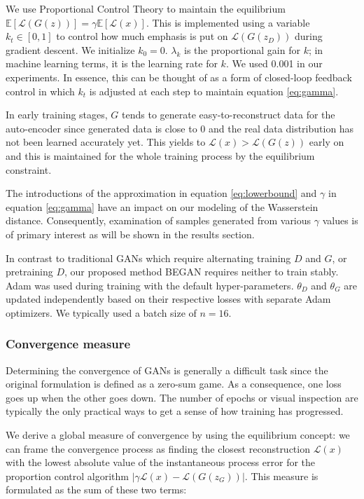 \documentclass[english]{article}
\begin{document}
We use Proportional Control Theory to maintain the equilibrium $\mathbb{E}\left[\mathcal{L}(G(z))\right]=\gamma\mathbb{E}\left[\mathcal{L}(x)\right]$.
This is implemented using a variable $k_{t}\in\left[0,1\right]$ to
control how much emphasis is put on $\mathcal{L}(G(z_{D}))$ during
gradient descent. We initialize $k_{0}=0$. $\lambda_{k}$ is the
proportional gain for $k$; in machine learning terms, it is the learning
rate for $k$. We used 0.001 in our experiments. In essence, this
can be thought of as a form of closed-loop feedback control in which
$k_{t}$ is adjusted at each step to maintain equation \ref{eq:gamma}.

In early training stages, $G$ tends to generate easy-to-reconstruct
data for the auto-encoder since generated data is close to 0 and the
real data distribution has not been learned accurately yet. This yields
to $\mathcal{L}(x)>\mathcal{L}(G(z))$ early on and this is maintained
for the whole training process by the equilibrium constraint. 

The introductions of the approximation in equation \ref{eq:lowerbound}
and $\gamma$ in equation \ref{eq:gamma} have an impact on our modeling
of the Wasserstein distance. Consequently, examination of samples
generated from various $\gamma$ values is of primary interest as
will be shown in the results section. 

In contrast to traditional GANs which require alternating training
$D$ and $G$, or pretraining $D$, our proposed method BEGAN requires
neither to train stably. Adam \cite{kingma2014adam} was used during
training with the default hyper-parameters. $\theta_{D}$ and $\theta_{G}$
are updated independently based on their respective losses with separate
Adam optimizers. We typically used a batch size of $n=16$. 


\subsubsection{Convergence measure}

Determining the convergence of GANs is generally a difficult task
since the original formulation is defined as a zero-sum game. As a
consequence, one loss goes up when the other goes down. The number
of epochs or visual inspection are typically the only practical ways
to get a sense of how training has progressed.

We derive a global measure of convergence by using the equilibrium
concept: we can frame the convergence process as finding the closest
reconstruction $\mathcal{L}(x)$ with the lowest absolute value of
the instantaneous process error for the proportion control algorithm
$|\gamma\mathcal{L}(x)-\mathcal{L}(G(z_{G}))|$. This measure is formulated
as the sum of these two terms:
\end{document}
